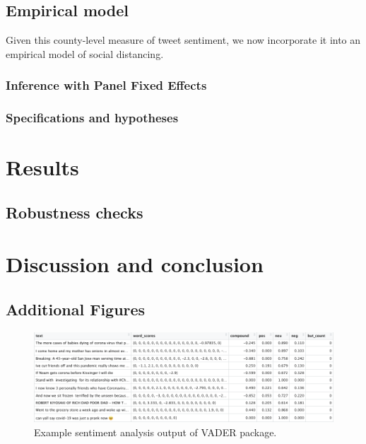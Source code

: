 \documentclass{article}
\begin{document}
\subsection{Empirical model}
Given this county-level measure of tweet sentiment, we now incorporate it into an empirical model of social distancing.
\subsubsection{Inference with Panel Fixed Effects}
\subsubsection{Specifications and hypotheses}

\section{Results}%

\subsection{Robustness checks}

\section{Discussion and conclusion} %


\printbibliography
\newpage
\begin{landscape}
\appendix 
\section{Additional Figures} \label{add-figs}
\vspace{1in}
\begin{figure}[h!]
  \includegraphics[width=1.4\textwidth]{figs/vader-table.png}    
  \centering
  \caption{Example sentiment analysis output of VADER package.}
\end{figure}
\end{landscape}
\end{document}
